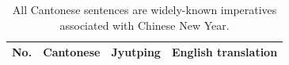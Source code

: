 \begin{table}[!htbp]
\begin{center}
\begin{tabular}{cccc} %
\toprule
\textbf{No.} & \textbf{Cantonese} & \textbf{Jyutping} & \textbf{English translation} \\ 
\midrule
\bottomrule
\end{tabular}
\caption{All Cantonese sentences are widely-known imperatives associated with Chinese New Year.}
\label{ch2:tab:can_sent}
\end{center}
\end{table}

